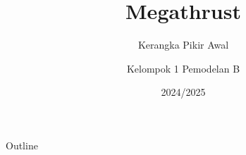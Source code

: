 \documentclass{beamer}
\title{Megathrust}
\subtitle{Kerangka Pikir Awal}
\date[]{2024/2025}
\author[]{Kelompok 1 Pemodelan B}
\begin{document}
\begin{frame}
\titlepage
\end{frame}

\begin{frame}{Outline}
    \tableofcontents
\end{frame}



\end{document}

